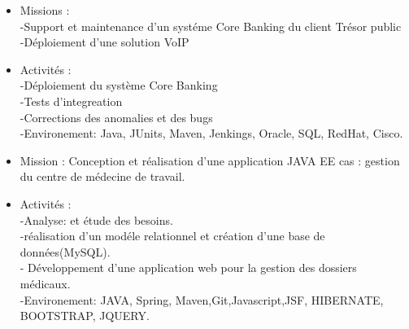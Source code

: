 \documentclass[10pt,a4paper]{altacv}
\begin{document}
\begin{itemize}
\item Missions :\\
-Support et maintenance d'un systéme Core Banking du client Trésor public\\
-Déploiement d'une solution VoIP\\
\item Activités :\\
-Déploiement du système Core Banking\\
-Tests d'integreation \\
-Corrections des anomalies et des bugs \\
-Environement: Java, JUnits, Maven, Jenkings, Oracle, SQL, RedHat, Cisco.  
\end{itemize}

\divider

\begin{itemize}
\item Mission : Conception et réalisation d'une application JAVA EE cas : gestion du centre de médecine de travail.  \\
\item Activités :\\
-Analyse: et étude des besoins.\\
-réalisation d’un modéle relationnel et création d’une base de
données(MySQL).\\
- Développement d’une application web pour la gestion des dossiers
médicaux.\\
-Environement: JAVA, Spring, Maven,Git,Javascript,JSF, HIBERNATE, BOOTSTRAP, JQUERY.

\end{itemize}

\divider


\end{document}
